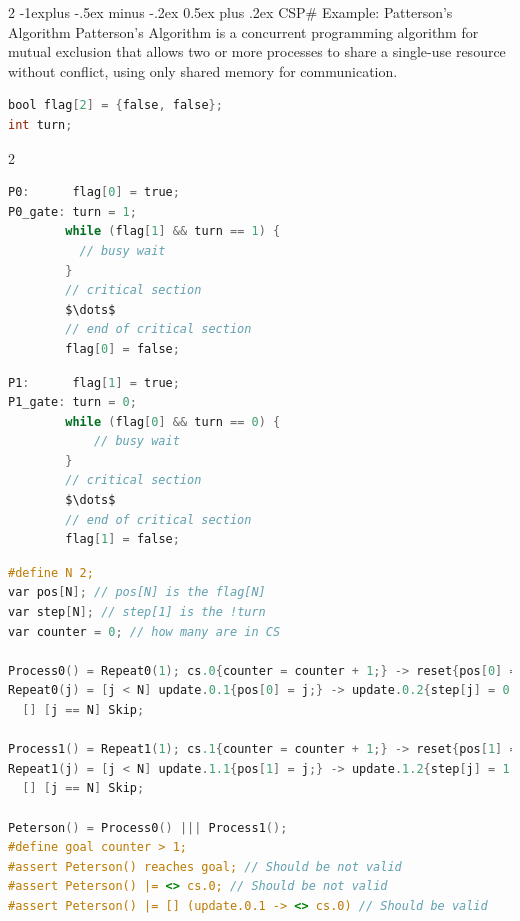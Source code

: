 \documentclass[10pt, landscape]{article}
\makeatletter
\renewcommand{\subsection}{\@startsection{subsection}{2}{0mm}%
  {-1explus -.5ex minus -.2ex}%
  {0.5ex plus .2ex}%
{\normalfont\normalsize\bfseries}}
\makeatother
\begin{document}
\begin{multicols*}{2}
  \subsection{CSP\# Example: Patterson's Algorithm}
  Patterson's Algorithm is a concurrent programming algorithm for mutual exclusion that allows two or more processes to share a single-use resource without conflict, using only shared memory for communication.
\begin{lstlisting}[language=C, basicstyle=\scriptsize\selectfont\ttfamily, mathescape]
bool flag[2] = {false, false};
int turn;
\end{lstlisting}
  \begin{multicols}{2}
\begin{lstlisting}[language=C, basicstyle=\scriptsize\selectfont\ttfamily, mathescape]
P0:      flag[0] = true;
P0_gate: turn = 1;
        while (flag[1] && turn == 1) {
          // busy wait
        }
        // critical section
        $\dots$
        // end of critical section
        flag[0] = false;
\end{lstlisting}
\begin{lstlisting}[language=C, basicstyle=\scriptsize\selectfont\ttfamily, mathescape]
P1:      flag[1] = true;
P1_gate: turn = 0;
        while (flag[0] && turn == 0) {
            // busy wait
        }
        // critical section
        $\dots$
        // end of critical section
        flag[1] = false;
\end{lstlisting}
  \end{multicols}

\begin{lstlisting}[language=C, basicstyle=\scriptsize\selectfont\ttfamily, mathescape]
#define N 2;
var pos[N]; // pos[N] is the flag[N]
var step[N]; // step[1] is the !turn
var counter = 0; // how many are in CS

Process0() = Repeat0(1); cs.0{counter = counter + 1;} -> reset{pos[0] = 0; counter = counter - 1;} -> Process0();
Repeat0(j) = [j < N] update.0.1{pos[0] = j;} -> update.0.2{step[j] = 0;} -> ([step[j] != 0 || (pos[1] < j)]idle.j -> Repeat0(j + 1)) 
  [] [j == N] Skip;

Process1() = Repeat1(1); cs.1{counter = counter + 1;} -> reset{pos[1] = 0; counter = counter - 1;} -> Process1();
Repeat1(j) = [j < N] update.1.1{pos[1] = j;} -> update.1.2{step[j] = 1;} -> ([step[j] != 1 || (pos[0] < j)]idle.j -> Repeat1(j + 1)) 
  [] [j == N] Skip;

Peterson() = Process0() ||| Process1();
#define goal counter > 1;
#assert Peterson() reaches goal; // Should be not valid
#assert Peterson() |= <> cs.0; // Should be not valid
#assert Peterson() |= [] (update.0.1 -> <> cs.0) // Should be valid
\end{lstlisting}


\end{multicols*}
\end{document}
